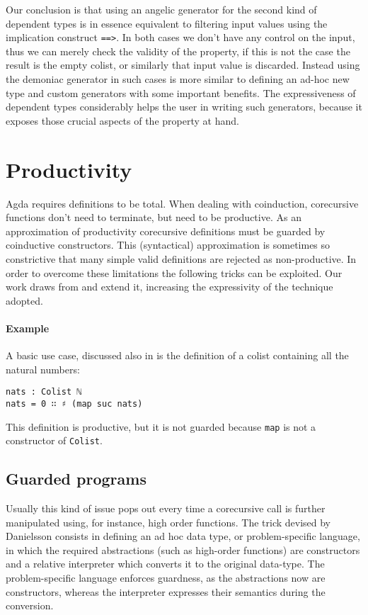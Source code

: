 \documentclass[10pt,a4paper]{article}
\begin{document}
Our conclusion is that using an angelic generator for the second kind of dependent types is in essence equivalent to filtering input values using the implication construct \texttt{==>}. In both cases we don't have any control on the input, thus we can merely check the validity of the property, if this is not the case the result is the empty colist, or similarly that input value is discarded.
Instead using the demoniac generator in such cases is more similar to defining an ad-hoc new type and custom generators with some important benefits.
The expressiveness of dependent types considerably helps the user in writing such generators, because it exposes those crucial aspects of the property at hand.

\section{Productivity}
\label{sec:Productivity}
Agda requires definitions to be total. When dealing with coinduction, corecursive functions don't need to terminate, but need to be productive.
As an approximation of productivity corecursive definitions must be guarded by coinductive constructors. This (syntactical) approximation is sometimes so constrictive that many simple valid definitions are rejected as non-productive. In order to overcome these limitations the following tricks can be exploited. Our work draws from \cite{DAN10} and extend it, increasing 
the expressivity of the technique adopted.

\paragraph{Example}
A basic use case, discussed also in \cite{DAN10} is the definition of a colist
containing all the natural numbers:
\begin{verbatim}
nats : Colist ℕ
nats = 0 ∷ ♯ (map suc nats)
\end{verbatim}
This definition is productive, but it is not guarded because \texttt{map} is not a constructor of \texttt{Colist}. 

\subsection{Guarded programs}
Usually this kind of issue pops out every time a corecursive call is further manipulated using, for instance, high order functions.
The trick devised by Danielsson consists in defining an ad hoc data type, or problem-specific language, in which the required abstractions (such as high-order functions) are constructors and a relative interpreter which converts it to the original data-type.
The problem-specific language enforces guardness, as the abstractions now are constructors, whereas the interpreter expresses their semantics during the conversion.
\end{document}
